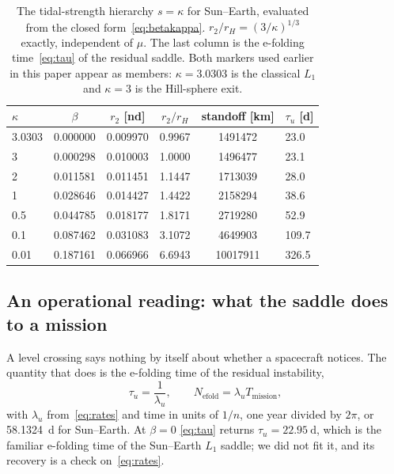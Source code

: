\documentclass[11pt,a4paper]{article}
\begin{document}
\begin{table}[t]
  \centering
  \caption{The tidal-strength hierarchy $s=\kappa$ for Sun--Earth, evaluated
  from the closed form~\eqref{eq:betakappa}. $r_2/r_H=(3/\kappa)^{1/3}$ exactly,
  independent of $\mu$. The last column is the e-folding
  time~\eqref{eq:tau} of the residual saddle. Both markers used earlier in this
  paper appear as members: $\kappa=3.0303$ is the classical $L_1$ and
  $\kappa=3$ is the Hill-sphere exit.}
  \label{tab:hierarchy}
  \begin{tabular}{lccccl}
    \toprule
    $\kappa$ & $\beta$ & $r_2$ [nd] & $r_2/r_H$ &
    standoff [\si{\kilo\metre}] & $\tau_u$ [d] \\
    \midrule
    \num{3.0303} & \num{0.000000} & \num{0.009970} & \num{0.9967} & \num{1491472} & \num{23.0} \\
    \num{3}      & \num{0.000298} & \num{0.010003} & \num{1.0000} & \num{1496477} & \num{23.1} \\
    \num{2}      & \num{0.011581} & \num{0.011451} & \num{1.1447} & \num{1713039} & \num{28.0} \\
    \num{1}      & \num{0.028646} & \num{0.014427} & \num{1.4422} & \num{2158294} & \num{38.6} \\
    \num{0.5}    & \num{0.044785} & \num{0.018177} & \num{1.8171} & \num{2719280} & \num{52.9} \\
    \num{0.1}    & \num{0.087462} & \num{0.031083} & \num{3.1072} & \num{4649903} & \num{109.7} \\
    \num{0.01}   & \num{0.187161} & \num{0.066966} & \num{6.6943} & \num{10017911}& \num{326.5} \\
    \bottomrule
  \end{tabular}
\end{table}

\subsection{An operational reading: what the saddle does to a mission}
\label{sec:operational}

A level crossing says nothing by itself about whether a spacecraft notices.
The quantity that does is the e-folding time of the residual instability,
\begin{equation}
  \tau_u = \frac{1}{\lambda_u}, \qquad
  N_{\mathrm{efold}} = \lambda_u T_{\mathrm{mission}} ,
  \label{eq:tau}
\end{equation}
with $\lambda_u$ from~\eqref{eq:rates} and time in units of $1/n$, one year
divided by $2\pi$, or \SI{58.1324}{\day} for Sun--Earth. At $\beta=0$
\eqref{eq:tau} returns $\tau_u=\SI{22.95}{\day}$, which is the familiar
e-folding time of the Sun--Earth $L_1$ saddle; we did not fit it, and its
recovery is a check on~\eqref{eq:rates}.
\end{document}
